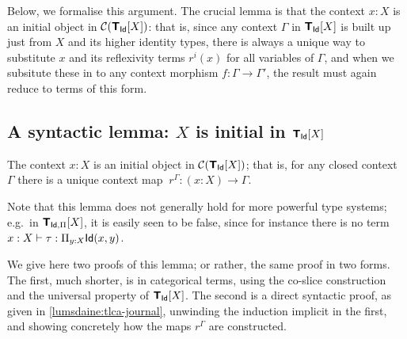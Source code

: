 \begin{para}
Below, we formalise this argument.  The crucial lemma is that the context $x:X$ is an initial object in $\mathcal{C}(\textbf{\textsf{T}}_{\mathsf{Id}}[X])$: that is, since any context $\Gamma$ in $\textbf{\textsf{T}}_{\mathsf{Id}}[X]$ is built up just from $X$ and its higher identity types, there is always a unique way to substitute $x$ and its reflexivity terms $r^i(x)$ for all variables of $\Gamma$, and when we subsitute these in to any context morphism $f \colon \Gamma \to \Gamma'$, the result must again reduce to terms of this form.
\end{para}

\subsection*{A syntactic lemma: \texorpdfstring{$X$}{X} is initial in \texorpdfstring{$\textbf{\textsf{T}}_{\mathsf{Id}}[X]$}{T\_Id[X]}} \label{subsec:initiality}

\begin{lemma} \label{lemma:initiality} The context $x:X$ is an initial object in $\mathcal{C}(\textbf{\textsf{T}}_{\mathsf{Id}}[X])$; that is, for any closed context $\Gamma$ there is a unique context map $\ r^\Gamma \colon (x:X) \to \Gamma$. 
\end{lemma}

Note that this lemma does not generally hold for more powerful type systems; e.g.\ in $\textbf{\textsf{T}}_{\mathsf{Id},\Pi}[X]$, it is easily seen to be false, since for instance there is no term $x:X \vdash \tau : \Pi_{y:X} \mathsf{Id}(x,y)$.

We give here two proofs of this lemma; or rather, the same proof in two forms.  The first, much shorter, is in categorical terms, using the co-slice construction and the universal property of $\textbf{\textsf{T}}_{\mathsf{Id}}[X]$.  The second is a direct syntactic proof, as given in \ref{lumsdaine:tlca-journal}, unwinding the induction implicit in the first, and showing concretely how the maps $r^\Gamma$ are constructed.

